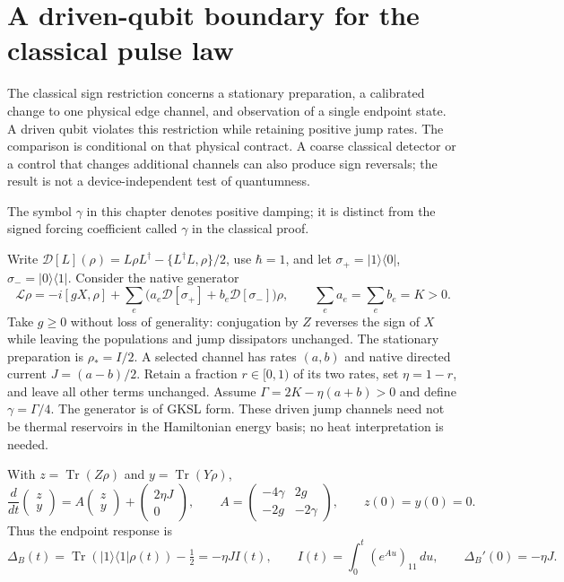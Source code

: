 \chapter{A driven-qubit boundary for the classical pulse law}
\label{sec:quantum-pulse}

The classical sign restriction concerns a stationary preparation, a calibrated
change to one physical edge channel, and observation of a single endpoint
state. A driven qubit violates this restriction while retaining positive jump
rates. The comparison is conditional on that physical contract. A coarse
classical detector or a control that changes additional channels can also
produce sign reversals; the result is not a device-independent test of
quantumness.

The symbol $\gamma$ in this chapter denotes positive damping; it is distinct
from the signed forcing coefficient called $\gamma$ in the classical proof.

Write $\mathcal D[L](\rho)=L\rho L^\dagger-
\{L^\dagger L,\rho\}/2$, use $\hbar=1$, and let
$\sigma_+=|1\rangle\langle0|$, $\sigma_-=|0\rangle\langle1|$.
Consider the native generator
\begin{equation}
 \mathcal L\rho=-i[gX,\rho]+
 \sum_e\bigl(a_e\mathcal D[\sigma_+]+b_e\mathcal D[\sigma_-]\bigr)\rho,
 \qquad \sum_ea_e=\sum_eb_e=K>0.
\end{equation}
Take $g\geq0$ without loss of generality: conjugation by $Z$ reverses the
sign of $X$ while leaving the populations and jump dissipators unchanged.
The stationary preparation is $\rho_*=I/2$. A selected channel has rates
$(a,b)$ and native directed current $J=(a-b)/2$. Retain a fraction
$r\in[0,1)$ of its two rates, set $\eta=1-r$, and leave all other terms
unchanged. Assume $\Gamma=2K-\eta(a+b)>0$ and define $\gamma=\Gamma/4$.
The generator is of GKSL form. These driven jump channels need not be thermal
reservoirs in the Hamiltonian energy basis; no heat interpretation is needed.

With $z=\operatorname{Tr}(Z\rho)$ and $y=\operatorname{Tr}(Y\rho)$,
\begin{equation}
 \frac{d}{dt}\begin{pmatrix}z\\y\end{pmatrix}
 =A\begin{pmatrix}z\\y\end{pmatrix}
   +\begin{pmatrix}2\eta J\\0\end{pmatrix},
 \qquad A=\begin{pmatrix}-4\gamma&2g\\-2g&-2\gamma\end{pmatrix},
 \qquad z(0)=y(0)=0.
\end{equation}
Thus the endpoint response is
\begin{equation}
 \Delta_B(t)=\operatorname{Tr}(|1\rangle\langle1|\rho(t))-\tfrac12
 =-\eta J I(t),\qquad
 I(t)=\int_0^t(e^{Au})_{11}\,du,
 \qquad \Delta_B'(0)=-\eta J.
 \label{eq:quantum-pulse-integral}
\end{equation}

